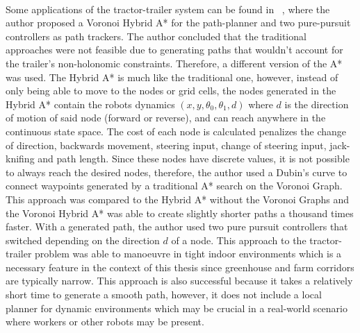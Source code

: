 \paragraph{}Some applications of the tractor-trailer system can be found in ~\cite{theman}, 
where the author proposed a Voronoi Hybrid A* for the path-planner and two pure-pursuit controllers 
as path trackers. The author concluded that the traditional approaches were not feasible due 
to generating paths that wouldn't account for the trailer's non-holonomic constraints. Therefore, 
a different version of the A* was used. The Hybrid A* is much like the traditional one, however, 
instead of only being able to move to the nodes or grid cells, the nodes generated in the Hybrid A* 
contain the robots dynamics $(x,y,\theta_0,\theta_1,d)$ where $d$ is the direction of motion of said 
node (forward or reverse), and can reach anywhere in the continuous state space. The cost of each 
node is calculated penalizes the change of direction, backwards movement, steering input, change of 
steering input, jack-knifing and path length. Since these nodes have discrete values, it is not 
possible to always reach the desired nodes, therefore, the author used a Dubin's curve to connect 
waypoints generated by a traditional A* search on the Voronoi Graph. This approach was compared to the Hybrid A* without 
the Voronoi Graphs and the Voronoi Hybrid A* was able to create slightly shorter paths a thousand times 
faster. With a generated path, the author used two pure pursuit controllers that switched depending on the 
direction $d$ of a node. This approach to the tractor-trailer problem was able to manoeuvre in 
tight indoor environments which is a necessary feature in the context of this thesis since greenhouse 
and farm corridors are typically narrow. This approach is also successful because it takes a relatively 
short time to generate a smooth path, however, it does not include a local planner for dynamic environments which 
may be crucial in a real-world scenario where workers or other robots may be present.

